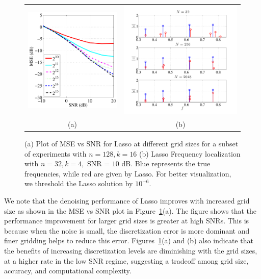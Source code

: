 \begin{figure}[htbp]
  \begin{tabular}{cc}
	\includegraphics[trim=10mm 0mm 5mm 3mm,clip,width=0.37\linewidth]{figures/mse_snr_256_64_lasso_randamp} &
	\includegraphics[trim=15mm 0mm 20mm 3mm,clip,width=0.45\linewidth]{figures/gridding} \\
(a)  & (b)
\end{tabular}
\caption{ 
(a) Plot of MSE vs SNR for Lasso at different grid sizes for a subset of experiments with $n=128, k = 16$\newline
(b) Lasso Frequency localization with $n=32, k = 4,$
SNR = $10$ dB. Blue represents the true frequencies, while red are given by Lasso. For better visualization, we threshold the Lasso solution by $10^{-6}$.}
\label{fig:lasso-compare}
\end{figure}

We note that the denoising performance of Lasso improves with increased grid
size as shown in the MSE vs SNR plot in Figure~\ref{fig:lasso-compare}(a). The
figure shows that the performance improvement for larger grid sizes is greater
at high SNRs. This is because when the noise is small, the discretization error
is more dominant and finer gridding helps to reduce this error.
Figures~\ref{fig:lasso-compare}(a) and (b) also indicate that the benefits of
increasing discretization levels are diminishing with the grid sizes, at a
higher rate in the low SNR regime, suggesting a tradeoff among grid size,
accuracy, and computational complexity.

